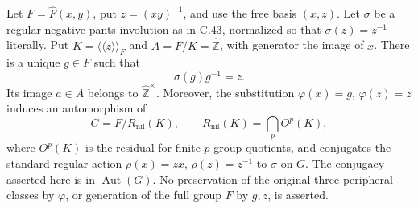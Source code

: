 Let $F=\widehat F(x,y)$, put $z=(xy)^{-1}$, and use the free
basis $(x,z)$. Let $\sigma$ be a regular negative pants involution
as in C.43, normalized so that $\sigma(z)=z^{-1}$ literally.
Put $K=\langle\!\langle z\rangle\!\rangle_F$ and
$A=F/K=\widehat{\mathbb Z}$, with generator the image of $x$.
There is a unique $g\in F$ such that
\[
                    \sigma(g)g^{-1}=z.                       \tag{C.44.1}
\]
Its image $a\in A$ belongs to $\widehat{\mathbb Z}^{\times}$.
Moreover, the substitution $\varphi(x)=g$, $\varphi(z)=z$
induces an automorphism of
\[
 G=F/R_{\mathrm{nil}}(K),\qquad
 R_{\mathrm{nil}}(K)=\bigcap_p O^p(K),
                                                               \tag{C.44.2}
\]
where $O^p(K)$ is the residual for finite $p$-group quotients,
and conjugates the standard regular action
$\rho(x)=zx$, $\rho(z)=z^{-1}$ to $\sigma$ on $G$.
The conjugacy asserted here is in $\operatorname{Aut}(G)$.
No preservation of the original three peripheral classes by
$\varphi$, or generation of the full group $F$ by $g,z$, is asserted.

